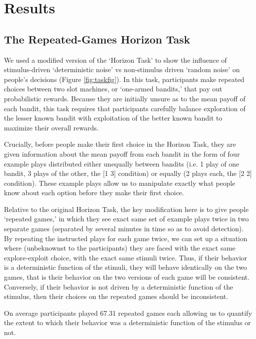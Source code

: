 \documentclass[12pt]{article}
\begin{document}
	\section*{Results}
	
	\subsection*{The Repeated-Games Horizon Task}
	We used a modified version of the `Horizon Task' \citep{wilson2014} to show the influence of stimulus-driven `deterministic noise' vs non-stimulus driven `random noise' on people's decisions (Figure \ref{fig:taskfig}). In this task, participants make repeated choices between two slot machines, or `one-armed bandits,' that pay out probabilistic rewards. Because they are initially unsure as to the mean payoff of each bandit, this task requires that participants carefully balance exploration of the lesser known bandit with exploitation of the better known bandit to maximize their overall rewards. 
	
	Crucially, before people make their first choice in the Horizon Task, they are given information about the mean payoff from each bandit in the form of four example plays distributed either unequally between bandits (i.e. 1 play of one bandit, 3 plays of the other, the [1 3] condition) or equally (2 plays each, the [2 2] condition). These example plays allow us to manipulate exactly what people know about each option before they make their first choice. 
	
	Relative to the original Horizon Task, the key modification here is to give people `repeated games,' in which they see exact same set of example plays twice in two separate games (separated by several minutes in time so as to avoid detection). By repeating the instructed plays for each game twice, we can set up a situation where (unbeknownst to the participants) they are faced with the exact same explore-exploit choice, with the exact same stimuli twice. Thus, if their behavior is a deterministic function of the stimuli, they will behave identically on the two games, that is their behavior on the two versions of each game will be consistent. Conversely, if their behavior is not driven by a deterministic function of the stimulus, then their choices on the repeated games should be inconsistent.
	
	On average participants played 67.31 repeated games each allowing us to quantify the extent to which their behavior was a deterministic function of the stimulus or not.
	
\end{document}
